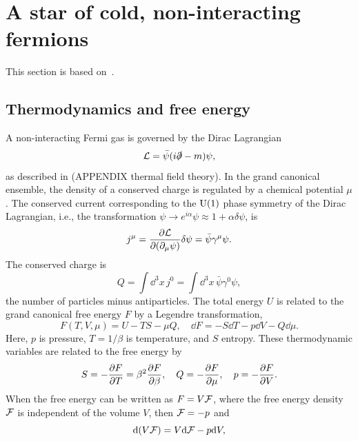 \section{A star of cold, non-interacting fermions}
\label{section: cold fermi star}

This section is based on~\autocite{glendenningCompactStarsNuclear2012,andersenIntroductionStatisticalMechanics2012,kapustaFiniteTemperatureFieldTheory2006}.

\subsection{Thermodynamics and free energy}

A non-interacting Fermi gas is governed by the Dirac Lagrangian
%
\begin{equation}
    \mathcal{L} = \bar \psi (i \slashed \partial - m) \psi,
\end{equation}
%
as described in (APPENDIX thermal field theory).
In the grand canonical ensemble, the density of a conserved charge is regulated by a chemical potential $\mu$.
The conserved current corresponding to the $\text U(1)$ phase symmetry of the Dirac Lagrangian, i.e., the transformation $\psi \rightarrow e^{i \alpha} \psi \approx 1 + \alpha \delta \psi$, is
%
\begin{equation}
    j^\mu = \pdv{\mathcal{L}}{(\partial_\mu \psi)} \delta \psi = \bar \psi \gamma^\mu \psi.
\end{equation}
%
The conserved charge is
%
\begin{equation}
    Q = \int \dd^3 x \, j^0 = \int \dd^3 x\, \bar \psi \gamma^0 \psi,
\end{equation}
%
the number of particles minus antiparticles.
The total energy $U$ is related to the grand canonical free energy $F$ by a Legendre transformation,
%
\begin{equation}
    F(T, V, \mu) = U - T S - \mu Q, \quad \dd F = - S \dd T - p \dd V - Q \dd \mu.
\end{equation}
%
Here, $p$ is pressure, $T = {1}/{\beta}$ is temperature, and $S$ entropy.
These thermodynamic variables are related to the free energy by
%
\begin{equation}
    S = - \pdv{F}{T} = \beta^2 \pdv{F}{\beta}, \quad
    Q = - \pdv{F}{\mu}, \quad
    p = - \pdv{F}{V}.
\end{equation}
%
When the free energy can be written as $F = V \mathcal{F}$, where the free energy density $\mathcal{F}$ is independent of the volume $V$, then $\mathcal{F} = - p$ and
%
\begin{equation}
    \dd (V \mathcal{F}) = V \dd \mathcal{F} - p \dd V,
\end{equation}

